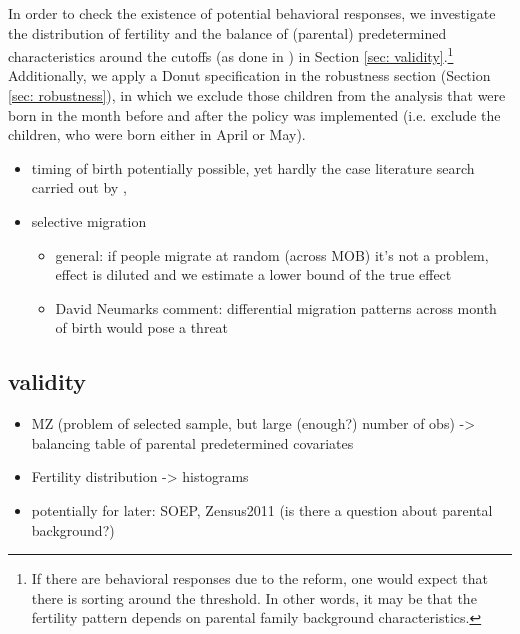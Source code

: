 \documentclass[11pt, a4paper]{article} %
\begin{document}
In order to check the existence of potential behavioral responses, we investigate the distribution of fertility and the balance of (parental) predetermined characteristics around the cutoffs (as done in \cite{dinardo2004economic}) in Section \ref{sec: validity}.\footnote{If there are behavioral responses due to the reform, one would expect that there is sorting around the threshold. In other words, it may be that the fertility pattern depends on parental family background characteristics.} Additionally, we apply a Donut specification in the robustness section (Section \ref{sec: robustness}), in which we exclude those children from the analysis that were born in the month before and after the policy was implemented (i.e. exclude the children, who were born either in April or May).



\begin{itemize}
	\item timing of birth potentially possible, yet hardly the case literature search carried out by \cite{Dustmann2012},
	\item selective migration 
  \begin{itemize}
    \item general: if people migrate at random (across MOB) it's not a problem, effect is diluted and we estimate a lower bound of the true effect
    \item David Neumarks comment: differential migration patterns across month of birth would pose a threat
  \end{itemize}
\end{itemize}




\subsection{validity}\label{sec:empirical_strategy_3validity}
\begin{itemize}
	\item MZ (problem of selected sample, but large (enough?) number of obs) -> balancing table of parental predetermined covariates
	\item Fertility distribution  -> histograms
	\item potentially for later: SOEP, Zensus2011 (is there a question about parental background?)
\end{itemize}

\end{document}
